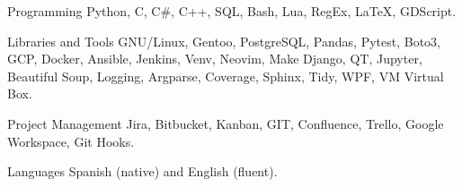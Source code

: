 

\begin{cvskills}

  \cvskill
    {Programming} %
    {Python, C, C\#, C++, SQL, Bash, Lua, RegEx, LaTeX, GDScript.} %

  \cvskill
    {Libraries and Tools}
    {GNU/Linux, Gentoo, PostgreSQL, Pandas, Pytest, Boto3, GCP, Docker, Ansible, Jenkins, Venv, Neovim, Make}
  \cvskill
    {}
    {Django, QT, Jupyter, Beautiful Soup, Logging, Argparse, Coverage, Sphinx, Tidy, WPF, VM Virtual Box.}

  \cvskill
    {Project Management}
    {Jira, Bitbucket, Kanban, GIT, Confluence, Trello, Google Workspace, Git Hooks.}

  \cvskill
    {Languages}
    {Spanish (native) and English (fluent).}


\end{cvskills}
